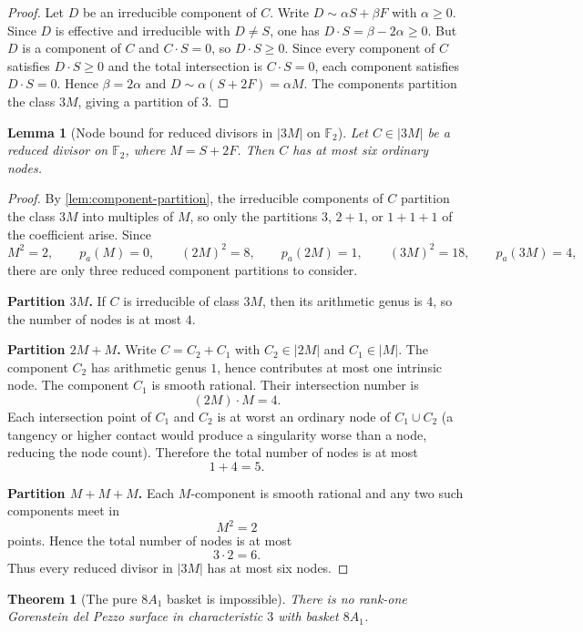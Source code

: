 \documentclass[11pt]{article}
\newtheorem{theorem}{Theorem}[section]
\newtheorem{lemma}[lemma]{Lemma}
\theoremstyle{definition}
\begin{document}
\begin{proof}
Let $D$ be an irreducible component of $C$. Write $D\sim \alpha S+\beta F$ with $\alpha\ge 0$. Since $D$ is effective and irreducible with $D\ne S$, one has $D\cdot S=\beta-2\alpha\ge 0$. But $D$ is a component of $C$ and $C\cdot S=0$, so $D\cdot S\ge 0$. Since every component of $C$ satisfies $D\cdot S\ge 0$ and the total intersection is $C\cdot S=0$, each component satisfies $D\cdot S=0$. Hence $\beta=2\alpha$ and $D\sim \alpha(S+2F)=\alpha M$. The components partition the class $3M$, giving a partition of $3$.
\end{proof}

\begin{lemma}[Node bound for reduced divisors in $|3M|$ on $\mathbb F_2$]\label{lem:node-bound}
Let $C\in |3M|$ be a reduced divisor on $\mathbb F_2$, where $M=S+2F$. Then $C$ has at most six ordinary nodes.
\end{lemma}

\begin{proof}
By \cref{lem:component-partition}, the irreducible components of $C$ partition the class $3M$ into multiples of $M$, so only the partitions $3$, $2+1$, or $1+1+1$ of the coefficient arise. Since
\[
M^2=2,
\qquad
p_a(M)=0,
\qquad
(2M)^2=8,
\qquad
p_a(2M)=1,
\qquad
(3M)^2=18,
\qquad
p_a(3M)=4,
\]
there are only three reduced component partitions to consider.

\medskip
\noindent
\textbf{Partition $3M$.}
If $C$ is irreducible of class $3M$, then its arithmetic genus is $4$, so the number of nodes is at most $4$.

\medskip
\noindent
\textbf{Partition $2M+M$.}
Write $C=C_2+C_1$ with $C_2\in |2M|$ and $C_1\in |M|$. The component $C_2$ has arithmetic genus $1$, hence contributes at most one intrinsic node. The component $C_1$ is smooth rational. Their intersection number is
\[
(2M)\cdot M=4.
\]
Each intersection point of $C_1$ and $C_2$ is at worst an ordinary node of $C_1\cup C_2$ (a tangency or higher contact would produce a singularity worse than a node, reducing the node count). Therefore the total number of nodes is at most
\[
1+4=5.
\]

\medskip
\noindent
\textbf{Partition $M+M+M$.}
Each $M$-component is smooth rational and any two such components meet in
\[
M^2=2
\]
points. Hence the total number of nodes is at most
\[
3\cdot 2=6.
\]
Thus every reduced divisor in $|3M|$ has at most six nodes.
\end{proof}

\begin{theorem}[The pure $8A_1$ basket is impossible]\label{thm:pure8a1-impossible}
There is no rank-one Gorenstein del Pezzo surface in characteristic $3$ with basket $8A_1$.
\end{theorem}
\end{document}
